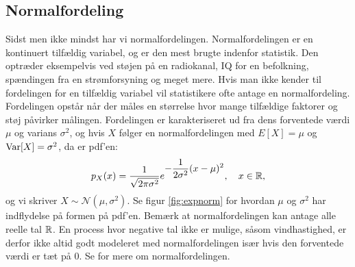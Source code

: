 \subsection{Normalfordeling}
Sidst men ikke mindst har vi normalfordelingen. Normalfordelingen er en kontinuert tilfældig variabel, og er den mest brugte indenfor statistik. Den optræder eksempelvis ved støjen på en radiokanal, IQ for en befolkning, spændingen fra en strømforsyning og meget mere. Hvis man ikke kender til fordelingen for en tilfældig variabel vil statistikere ofte antage en normalfordeling.   Fordelingen opstår når der måles en størrelse hvor mange tilfældige faktorer og støj påvirker målingen. Fordelingen er karakteriseret ud fra dens forventede værdi $\mu$ og varians $\sigma^2$, og hvis $X$ følger en normalfordelingen med $E[X] = \mu$ og $\operatorname{Var}[X] = \sigma^2$, da er pdf'en:
\begin{align*}
p_X(x) = \frac{1}{\sqrt{2\pi\sigma^2}}e^{\displaystyle-\frac{1}{2\sigma^2}(x-\mu)^2}, \quad  x \in \mathbb{R},
\end{align*}
og vi skriver $X \sim \mathcal{N}(\mu,\sigma^2)$. Se figur \ref{fig:expnorm} for hvordan $\mu$ og $\sigma^2$ har indflydelse på formen på pdf'en. Bemærk at normalfordelingen kan antage alle reelle tal $\mathbb{R}$. En process hvor negative tal ikke er mulige, såsom vindhastighed, er derfor ikke altid godt modeleret med normalfordelingen især hvis den forventede værdi er tæt på $0$. Se \cite[127-131]{olofsson2012} for mere om normalfordelingen. 
